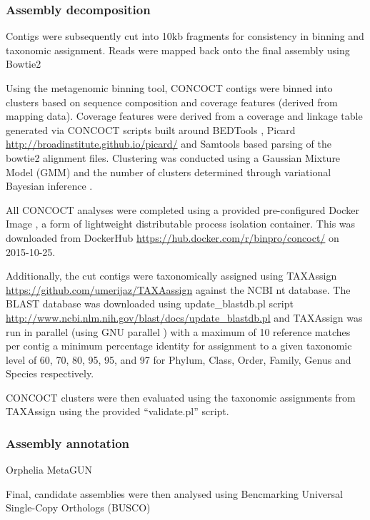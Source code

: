 \subsubsection{Assembly decomposition}

Contigs were subsequently cut into 10kb fragments for consistency
in binning and taxonomic assignment.
Reads were mapped back onto the final assembly using Bowtie2 
\citep{Langmead2012} 

Using the metagenomic binning tool, CONCOCT \citep{Alneberg2014}
contigs were binned into clusters based on sequence composition
and coverage features (derived from mapping data).
Coverage features were derived from a coverage and linkage table
generated via CONCOCT scripts built around BEDTools \citep{Quinlan2010,Quinlan2014}, Picard \url{http://broadinstitute.github.io/picard/} 
and Samtools \citep{Li2009} 
based parsing
of the bowtie2 alignment files.
Clustering was conducted using a Gaussian Mixture Model (GMM) \citep{Bishop2006}
and the number of clusters determined through variational Bayesian inference \citep{Corduneanu2001}.

All CONCOCT analyses were completed using a provided pre-configured 
Docker Image \citep{Merkel2014}, a form of lightweight 
distributable process isolation container.
This was downloaded from DockerHub \url{https://hub.docker.com/r/binpro/concoct/}
on 2015-10-25.

Additionally, the cut contigs were taxonomically assigned 
using TAXAssign \url{https://github.com/umerijaz/TAXAassign} against the NCBI nt database. 
The BLAST database was downloaded using update\_blastdb.pl script \url{http://www.ncbi.nlm.nih.gov/blast/docs/update_blastdb.pl}
and TAXAssign was run in parallel (using GNU parallel \citep{Tange2011a})
with a maximum of 10 reference matches
per contig a minimum percentage identity for assignment
to a given taxonomic level of 60, 70, 80, 95, 95, and 97
for Phylum, Class, Order, Family, Genus and Species respectively. 

CONCOCT clusters were then evaluated using the taxonomic assignments from TAXAssign
using the provided ``validate.pl'' script.

\subsubsection{Assembly annotation}
Orphelia \citep{Hoff2009}
MetaGUN \citep{Liu2013}

Final, candidate assemblies were then analysed using 
Bencmarking Universal Single-Copy Orthologs (BUSCO) \citep{Simao2015}


